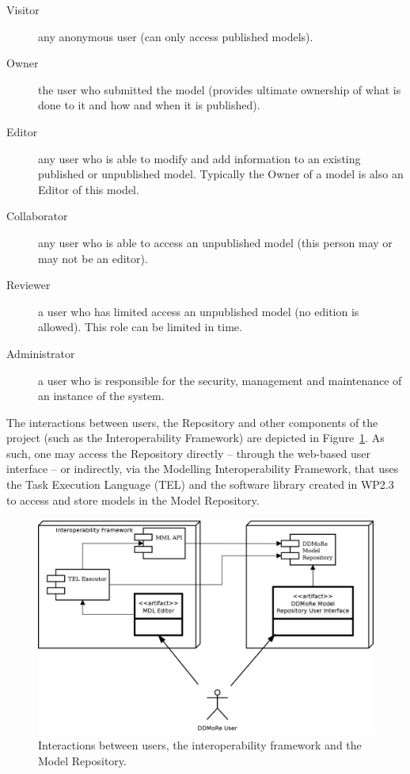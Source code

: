 \begin{description}
  \item[Visitor] any anonymous user (can only access \glspl{published model}).
  \item[Owner] the user who submitted the model (provides ultimate ownership of what is done to it and how and when it is published).
  \item[Editor] any user who is able to modify and add information to an existing published or \gls{unpublished model}. Typically the Owner of a model is also an Editor of this model.
  \item[Collaborator] any user who is able to access an unpublished model (this person may or may not be an editor).
  \item[Reviewer] a user who has limited access an unpublished model (no edition is allowed). This role can be limited in time.
  \item[Administrator] a user who is responsible for the security, management and maintenance of an instance of the system.
\end{description}

The interactions between users, the Repository and other components of the project (such as the Interoperability Framework) are depicted in Figure~\ref{fig:userInteraction}. As such, one may access the Repository directly -- through the web-based user interface -- or indirectly, via the Modelling Interoperability Framework, that uses the Task Execution Language (TEL) and the software library created in WP2.3 to access and store models in the \ddmore Model Repository.

\begin{figure}[htb]
\centering
\includegraphics{img/UserInteraction}
\caption{Interactions between users, the interoperability framework and the Model Repository.}
\label{fig:userInteraction}
\end{figure}
